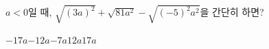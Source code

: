 $a<0$일 때, $\sqrt{(3a)^2}+\sqrt{81a^2}-\sqrt{(-5)^2a^2}$을 간단히 하면?
\begin{choices32}{$-17a$}{$-12a$}{$-7a$}{$12a$}{$17a$}\end{choices32}
